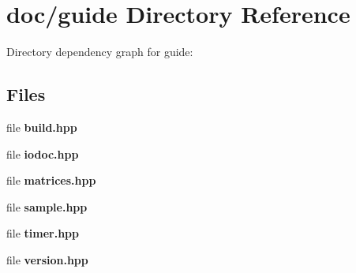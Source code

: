 \section{doc/guide Directory Reference}
\label{dir_2eb14df3bcf5911695476ae35171ea9c}
Directory dependency graph for guide\-:
\subsection*{Files}
\begin{DoxyCompactItemize}
\item 
file {\bf build.\-hpp}
\item 
file {\bf iodoc.\-hpp}
\item 
file {\bf matrices.\-hpp}
\item 
file {\bf sample.\-hpp}
\item 
file {\bf timer.\-hpp}
\item 
file {\bf version.\-hpp}
\end{DoxyCompactItemize}
